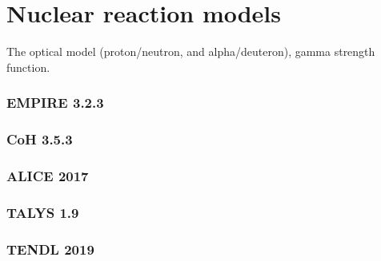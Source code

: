 \documentclass[a4paper,11pt,twoside]{book}
\begin{document}
\section{Nuclear reaction models}

The optical model (proton/neutron, and alpha/deuteron), gamma strength function. 

\subsubsection{EMPIRE 3.2.3}
\subsubsection{CoH 3.5.3}
\subsubsection{ALICE 2017}
\subsubsection{TALYS 1.9}
\subsubsection{TENDL 2019}





\end{document}
